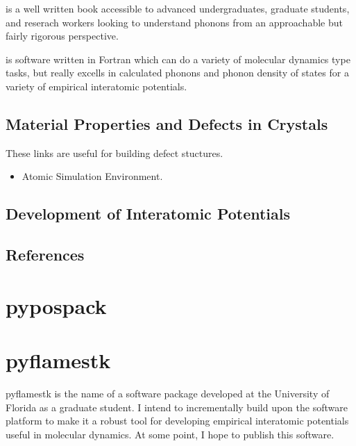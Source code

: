 \documentclass[letterpaper,10pt,english]{sphinxmanual}
\begin{document}
 is a well written book accessible to advanced undergraduates, graduate students, and reserach workers looking to understand phonons from an approachable but fairly rigorous perspective.

 is software written in Fortran which can do a variety of molecular dynamics type tasks, but really excells in calculated phonons and phonon density of states for a variety of empirical interatomic potentials.



\subsection{Material Properties and Defects in Crystals}
\label{\detokenize{computational_simulation_tools:material-properties-and-defects-in-crystals}}
These links are useful for building defect stuctures.
\begin{itemize}
\item {} 
Atomic Simulation Environment.  

\end{itemize}


\subsection{Development of Interatomic Potentials}
\label{\detokenize{computational_simulation_tools:development-of-interatomic-potentials}}

\subsection{References}
\label{\detokenize{computational_simulation_tools:references}}



\section{pypospack}
\label{\detokenize{pypospack/index:pypospack}}\label{\detokenize{pypospack/index::doc}}

\section{pyflamestk}
\label{\detokenize{pyflamestk/index:pyflamestk}}\label{\detokenize{pyflamestk/index::doc}}
pyflamestk is the name of a software package developed at the University of Florida as a graduate student.  I intend to incrementally build upon the software platform to make it a robust tool for developing empirical interatomic potentials useful in molecular dynamics.  At some point, I hope to publish this software.
\end{document}

